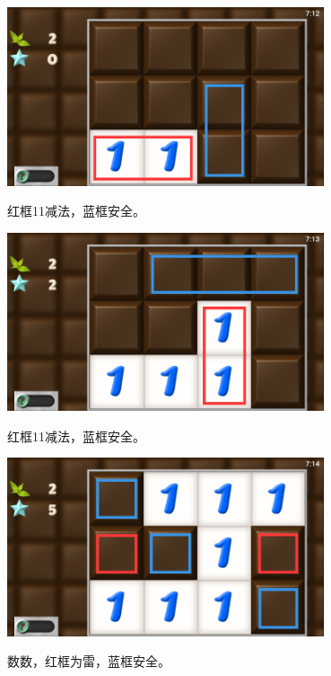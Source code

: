 \subsection{} %
\begin{center}
    \includegraphics[width=0.7\textwidth]{puzzle/2-1.png}
\end{center}
红框11减法，蓝框安全。
\begin{center}
    \includegraphics[width=0.7\textwidth]{puzzle/2-2.png}
\end{center}
红框11减法，蓝框安全。
\begin{center}
    \includegraphics[width=0.7\textwidth]{puzzle/2-3.png}
\end{center}
数数，红框为雷，蓝框安全。

